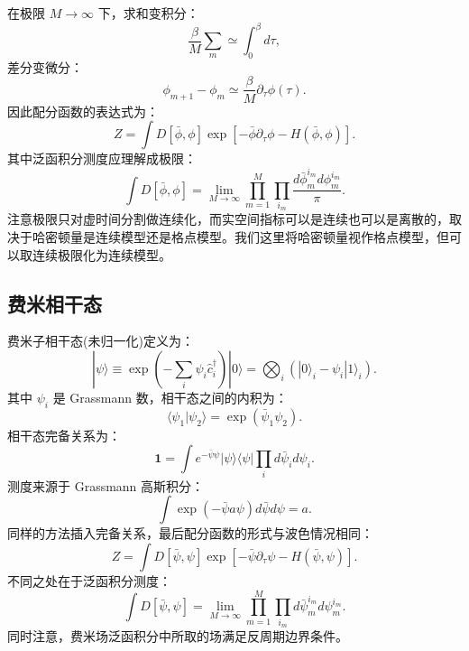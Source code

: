 \documentclass[UTF8]{ctexart}
\begin{document}
在极限 $M \rightarrow \infty$ 下，求和变积分：
\begin{equation}
	\frac{\beta}{M}\sum_m \simeq \int_0^\beta d\tau,
\end{equation}
差分变微分：
\begin{equation}
	\phi_{m+1}-\phi_m \simeq \frac{\beta}{M}\partial_\tau \phi(\tau).
\end{equation}
因此配分函数的表达式为：
\begin{equation}
	Z = \int D[\bar\phi,\phi] \exp\left[-\bar\phi\partial_\tau \phi-H(\bar\phi,\phi) \right].
\end{equation}
其中泛函积分测度应理解成极限：
\begin{equation}
	\int D[\bar\phi,\phi] = \lim_{M\rightarrow \infty} \prod_{m=1}^{M}\prod_{i_m} \frac{d\bar\phi_{m}^{i_m} d\phi_{m}^{i_m}}{\pi}.
\end{equation}
注意极限只对虚时间分割做连续化，而实空间指标可以是连续也可以是离散的，取决于哈密顿量是连续模型还是格点模型。我们这里将哈密顿量视作格点模型，但可以取连续极限化为连续模型。



\subsection*{费米相干态}
\noindent
费米子相干态(未归一化)定义为：
\begin{equation}
	|\psi\rangle \equiv \exp\left(-\sum_i \psi_i \hat c_i^\dagger \right)|0\rangle = \bigotimes_i \left(|0\rangle_i - \psi_i|1\rangle_i \right).
\end{equation}
其中 $\psi_i$ 是 Grassmann 数，相干态之间的内积为：
\begin{equation}
	\langle \psi_1 | \psi_2 \rangle = \exp(\bar\psi_1 \psi_2).
\end{equation}
相干态完备关系为：
\begin{equation}
	\bm 1 = \int e^{-\bar\psi \psi} |\psi\rangle\langle\psi| \prod_i d\bar\psi_i d\psi_i.
\end{equation}
测度来源于 Grassmann 高斯积分：
\begin{equation}
	\int \exp(-\bar\psi a \psi) d\bar\psi d\psi = a.
\end{equation}
同样的方法插入完备关系，最后配分函数的形式与波色情况相同：
\begin{equation}
	Z = \int D[\bar\psi,\psi] \exp\left[-\bar\psi\partial_\tau \psi-H(\bar\psi,\psi) \right].
\end{equation}
不同之处在于泛函积分测度：
\begin{equation}
	\int D[\bar\psi,\psi] = \lim_{M\rightarrow \infty} \prod_{m=1}^{M}\prod_{i_m} d\bar\psi_{m}^{i_m} d\psi_{m}^{i_m}.
\end{equation}
同时注意，费米场泛函积分中所取的场满足反周期边界条件。
\end{document}
